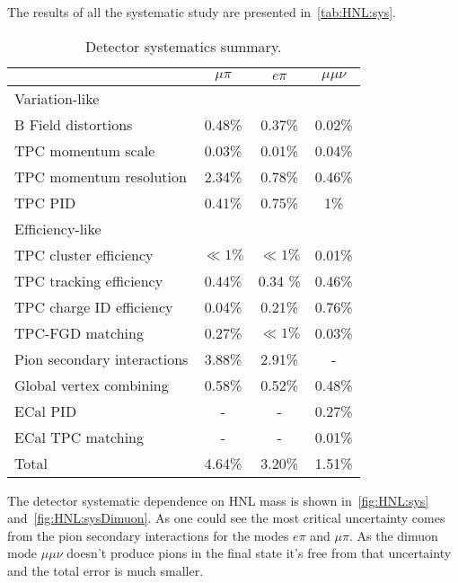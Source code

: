 \documentclass[../main.tex]{subfiles}
\begin{document}
The results of all the systematic study are presented in~\autoref{tab:HNL:sys}.
\begin{table}[!ht]
\begin{center}
\begin{tabular}{|l |c| c| c|}
  \hline
   & $\mu\pi$ & $e\pi$ & $\mu\mu\nu$\\
  \hline
  \multicolumn{4}{||l|}{Variation-like} \\
  \hline
  B Field distortions                 & 0.48\%    & 0.37\%         &  0.02\%\\
  TPC momentum scale                  & 0.03\%    & 0.01\%         & 0.04\%\\
  TPC momentum resolution             & 2.34\%    & 0.78\%         & 0.46\%\\
  TPC PID                             & 0.41\%    & 0.75\%         & 1\%\\
  \hline
  \multicolumn{4}{||l|}{Efficiency-like} \\
  \hline
  TPC cluster efficiency              &   $\ll1\%$   &   $\ll1\%$  &  0.01\%\\
  TPC tracking efficiency             &   0.44\%     &  0.34 \%    & 0.46\% \\
  TPC charge ID efficiency            &   0.04\%     &   0.21\%    &   0.76\%\\
  TPC-FGD matching                    &   0.27\%     &    $\ll1\%$ & 0.03\%\\
  Pion secondary interactions         &   3.88\%     &   2.91\%    &  - \\
  Global vertex combining             &    0.58\%    &  0.52\%     & 0.48\%\\
  ECal PID                            &     -        &     -       & 0.27\%\\
  ECal TPC matching                   &     -        &     -       &  0.01\%\\
  \hline
  Total                               &   4.64\%     &  3.20\%     & 1.51\%\\
  \hline
\end{tabular}
\caption{Detector systematics summary.}
\label{tab:HNL:sys}
\end{center}
\end{table}

The detector systematic dependence on HNL mass is shown in~\autoref{fig:HNL:sys} and~\autoref{fig:HNL:sysDimuon}. As one could see the most critical uncertainty comes from the pion secondary interactions for the modes $e\pi$ and $\mu\pi$. As the dimuon mode $\mu\mu\nu$ doesn't produce pions in the final state it's free from that uncertainty and the total error is much smaller.
\end{document}
